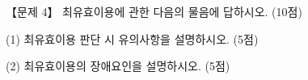 \begin{longquestion}{【문제 4】}
최유효이용에 관한 다음의 물음에 답하시오. (10점) \par
\medskip\noindent (1) 최유효이용 판단 시 유의사항을 설명하시오. (5점) \par
\medskip\noindent (2) 최유효이용의 장애요인을 설명하시오. (5점) \par
\end{longquestion}
